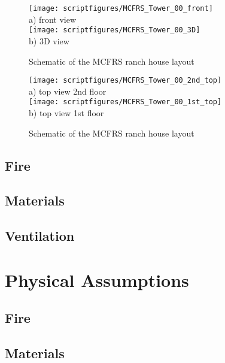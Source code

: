 \documentclass[11pt]{book}
\begin{document}
\begin{figure}[\figoptions]
\begin{center}
\texttt{[image: scriptfigures/MCFRS\_Tower\_00\_front]}\\
a) front view\\
\texttt{[image: scriptfigures/MCFRS\_Tower\_00\_3D]}\\
b) 3D view\\
\end{center}
\caption{Schematic of the MCFRS ranch house layout}
\label{figflashoverplan}%
\end{figure}

\begin{figure}[\figoptions]
\begin{center}
\texttt{[image: scriptfigures/MCFRS\_Tower\_00\_2nd\_top]}\\
a) top view 2nd floor\\
\texttt{[image: scriptfigures/MCFRS\_Tower\_00\_1st\_top]}\\
b) top view 1st floor\\
\end{center}
\caption{Schematic of the MCFRS ranch house layout}
\label{figflashoverplan}%
\end{figure}

\subsection{Fire}

\subsection{Materials}

\subsection{Ventilation}

\section{Physical Assumptions}
\subsection{Fire}

\subsection{Materials}
\end{document}
